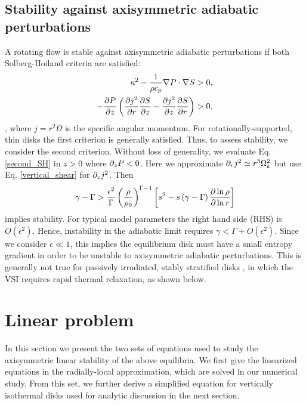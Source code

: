 \subsection{Stability against axisymmetric adiabatic
  perturbations}\label{solberg}
A rotating flow is stable against axisymmetric adiabatic perturbations
if both Solberg-Hoiland criteria  are satisfied:
\begin{align}
  \kappa^2 - \frac{1}{\rho c_p}\nabla P \cdot \nabla S &> 0,\\
  -\frac{\partial P}{\partial z}\left(\frac{\partial j^2}{\partial r}\frac{\partial S}{ \partial z} -
    \frac{\partial j^2}{\partial z}\frac{\partial S}{\partial r} \right)&>0. \label{second_SH} 
\end{align}
\citep{tassoul78}, where $j=r^2\Omega$ is the specific angular
momentum. For rotationally-supported, thin disks %
the first criterion is generally satisfied. 
Thus, to assess stability, we consider the second
criterion. 
Without loss of generality, we evaluate Eq. \ref{second_SH} in $z>0$
where $\partial_zP<0$. Here we approximate $\partial_r j^2\simeq r^3\Omega_k^2$ but
use Eq. \ref{vertical_shear} for $\partial_zj^2$. Then 
\begin{align}\label{solberg2}
  \gamma - \Gamma > \frac{\epsilon^2}{\Gamma}
  \left(\frac{\rho}{\rho_0}\right)^{\Gamma-1} \left[s^2
    -s\left(\gamma-\Gamma\right)\frac{\partial\ln{\rho}}{\partial\ln{r}} \right]
\end{align} 
implies stability. For typical model parameters the right hand
side (RHS) is $O(\epsilon^2)$. Hence, instability in the adiabatic limit  
requires $\gamma < \Gamma + O(\epsilon^2)$. Since we consider
$\epsilon\ll1$, this implies the equilibrium disk must have a small
entropy gradient in order to be unstable to axisymmetric adiabatic
perturbations. This is generally not true for passively irradiated, stably
stratified disks \citep{chiang97}, in which the VSI requires rapid
thermal relaxation, as shown below. 




\section{Linear problem}\label{linear} 
In this section we present the two sets of equations used to study the
axisymmetric linear stability of the above equilibria. We first give
the linearized equations in the radially-local approximation, which
are solved in our numerical study. From this set, we further derive a
simplified equation for vertically isothermal disks used for analytic
discussion in the next section. 


